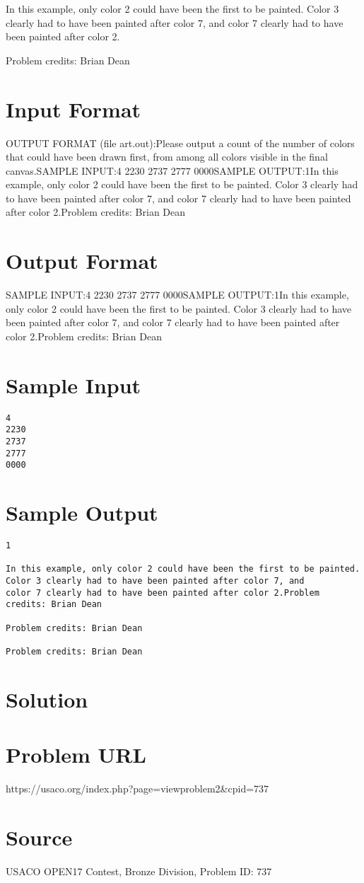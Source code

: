 \documentclass[12pt]{article}
\begin{document}
In this example, only color 2 could have been the first to be painted.  Color 3 clearly had to have been painted after color 7, and
color 7 clearly had to have been painted after color 2.


Problem credits: Brian Dean



\section*{Input Format}
OUTPUT FORMAT (file art.out):Please output a count of the number of colors that could have been drawn first,
from among all colors visible in the final canvas.SAMPLE INPUT:4
2230
2737
2777
0000SAMPLE OUTPUT:1In this example, only color 2 could have been the first to be painted.  Color 3 clearly had to have been painted after color 7, and
color 7 clearly had to have been painted after color 2.Problem credits: Brian Dean

\section*{Output Format}
SAMPLE INPUT:4
2230
2737
2777
0000SAMPLE OUTPUT:1In this example, only color 2 could have been the first to be painted.  Color 3 clearly had to have been painted after color 7, and
color 7 clearly had to have been painted after color 2.Problem credits: Brian Dean

\section*{Sample Input}
\begin{verbatim}
4
2230
2737
2777
0000
\end{verbatim}

\section*{Sample Output}
\begin{verbatim}
1

In this example, only color 2 could have been the first to be painted.  Color 3 clearly had to have been painted after color 7, and
color 7 clearly had to have been painted after color 2.Problem credits: Brian Dean

Problem credits: Brian Dean

Problem credits: Brian Dean
\end{verbatim}

\section*{Solution}


\section*{Problem URL}
https://usaco.org/index.php?page=viewproblem2&cpid=737

\section*{Source}
USACO OPEN17 Contest, Bronze Division, Problem ID: 737
\end{document}
